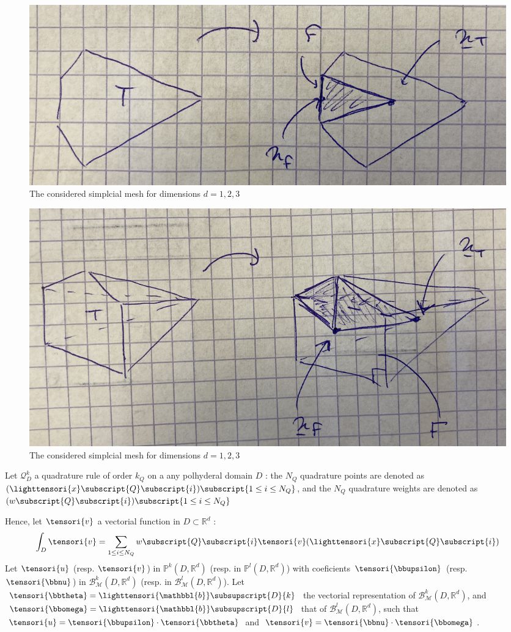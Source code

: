         \begin{figure}[h!]
            \centering
            \includegraphics[width=10.cm]{img/partition_0.png}
            \caption{The considered simplcial mesh for dimensions $d = 1, 2, 3$}
            \label{fig_partition_0}
        \end{figure}
        \begin{figure}[h!]
            \centering
            \includegraphics[width=10.cm]{img/partition_1.png}
            \caption{The considered simplcial mesh for dimensions $d = 1, 2, 3$}
            \label{fig_partition_1}
        \end{figure}

        Let $\mathcal{Q}_D^k$ a quadrature rule of order $k_Q$ on a any polhyderal domain $D$ : the $N_Q$ quadrature points are denoted as $(\lighttensori{x}\subscript{{Q}}\subscript{i})\subscript{1 \leq i \leq N_Q}$, and the $N_Q$ quadrature weights are denoted as $({w}\subscript{{Q}}\subscript{i})\subscript{1 \leq i \leq N_Q}$

        Hence, let $\tensori{v}$ a vectorial function in $D \subset \mathbb{R}^{d}$ :
        \begin{equation}
            \int_D \tensori{v} = \sum_{1 \leq i \leq N_Q} w\subscript{{Q}}\subscript{i} \tensori{v}(\lighttensori{x}\subscript{Q}\subscript{i})
        \end{equation}
        Let $\tensori{u}$ (resp. $\tensori{v}$) in $\mathbb{P}^k(D,\mathbb{R}^d)$ (resp. in $\mathbb{P}^l(D,\mathbb{R}^d)$) with coeficients $\tensori{\bbupsilon}$ (resp. $\tensori{\bbnu}$) in $\mathcal{B}_{\mathcal{M}}^k(D, \mathbb{R}^d)$ (resp. in $\mathcal{B}_{\mathcal{M}}^l(D, \mathbb{R}^d)$).
        Let $\tensori{\bbtheta} = \lighttensori{\mathbbl{b}}\subsupscript{D}{k}$ the vectorial representation of $\mathcal{B}_{\mathcal{M}}^k(D, \mathbb{R}^d)$, and $\tensori{\bbomega} = \lighttensori{\mathbbl{b}}\subsupscript{D}{l}$ that of $\mathcal{B}_{\mathcal{M}}^l(D, \mathbb{R}^d)$, such that $\tensori{u} = \tensori{\bbupsilon} \cdot \tensori{\bbtheta}$ and $\tensori{v} = \tensori{\bbnu} \cdot \tensori{\bbomega}$.
        
